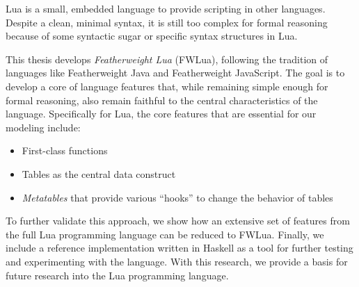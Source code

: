 Lua is a small, embedded language to provide scripting in other languages.  Despite a clean, minimal syntax, it is still too complex for formal reasoning because of some syntactic sugar or specific syntax structures in Lua.

This thesis develops \emph{Featherweight Lua} (FWLua), following the tradition of languages like Featherweight Java\cite{FWJA} and Featherweight JavaScript\cite{FWJS}.  The goal is to develop a core of language features that, while remaining simple enough for formal reasoning, also remain faithful to the central characteristics of the language.  Specifically for Lua, the core features that are essential for our modeling include:
\begin{itemize}
\item
First-class functions
\item
Tables as the central data construct
\item
\emph{Metatables} that provide various ``hooks'' to change the behavior of tables
\end{itemize}

To further validate this approach, we show how an extensive set of features
from the full Lua programming language can be reduced to FWLua. Finally, we include a reference implementation written in Haskell as a tool for further testing and experimenting with the language. With this research, we provide a basis for future research into the Lua programming language.